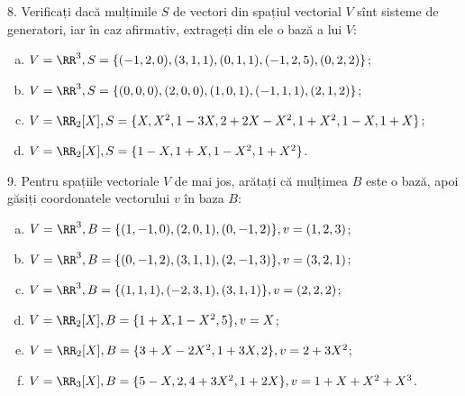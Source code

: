 \vspace{1cm}

8. Verificați dacă mulțimile $ S $ de vectori din spațiul vectorial $ V $ sînt
sisteme de generatori, iar în caz afirmativ, extrageți din ele o bază a lui $ V $:
\begin{enumerate}[(a)]
\item $ V = \RR^3, S = \{ (-1, 2, 0), (3, 1, 1), (0, 1, 1), (-1, 2, 5), (0, 2, 2) \} $;
\item $ V = \RR^3, S = \{ (0, 0, 0), (2, 0, 0), (1, 0, 1), (-1, 1, 1), (2, 1, 2) \} $;
\item $ V = \RR_2[X], S = \{ X, X^2, 1 - 3X, 2 + 2X - X^2, 1 + X^2, 1 - X, 1 + X \} $;
\item $ V = \RR_2[X], S = \{ 1 - X, 1 + X, 1 - X^2, 1 + X^2 \} $.
\end{enumerate}

\vspace{1cm}

9. Pentru spațiile vectoriale $ V $ de mai jos, arătați că mulțimea $ B $
este o bază, apoi găsiți coordonatele vectorului $ v $ în baza $ B $:
\begin{enumerate}[(a)]
\item $ V = \RR^3, B = \{ (1, -1, 0), (2, 0, 1), (0, -1, 2) \}, %
  v = (1, 2, 3) $;
\item $ V = \RR^3, B = \{ (0, -1, 2), (3, 1, 1), (2, -1, 3) \}, %
  v = (3, 2, 1) $;
\item $ V = \RR^3, B = \{ (1, 1, 1), (-2, 3, 1), (3, 1, 1) \}, %
  v = (2, 2, 2) $;
\item $ V = \RR_2[X], B = \{ 1 + X, 1 - X^2, 5 \}, v = X $;
\item $ V = \RR_2[X], B = \{ 3 + X - 2X^2, 1 + 3X, 2 \}, v = 2 + 3X^2 $;
\item $ V = \RR_3[X], B = \{ 5 - X, 2, 4 + 3X^2, 1 + 2X \}, v = 1 + X + X^2 + X^3 $.
\end{enumerate}

